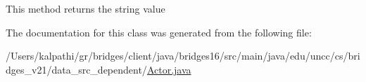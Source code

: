 This method returns the string value 

The documentation for this class was generated from the following file\+:\begin{DoxyCompactItemize}
\item 
/\+Users/kalpathi/gr/bridges/client/java/bridges16/src/main/java/edu/uncc/cs/bridges\+\_\+v21/data\+\_\+src\+\_\+dependent/\hyperlink{_actor_8java}{Actor.\+java}\end{DoxyCompactItemize}
